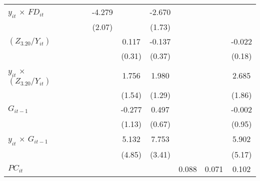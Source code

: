 \documentclass[12pt, a4paper]{article}
\begin{document}
\begin{table}
\begin{threeparttable}
{\begin{tabular}{l*{9}{c}}
				$y_{it}$ $\times$ $FD_{it}$ &                     &                     &                     &      -4.279\sym{*}  &                     &      -2.670         &                     &                     &                     \\
				&                     &                     &                     &      (2.07)         &                     &      (1.73)         &                     &                     &                     \\
				$(Z_{3.20}/Y_{it})$          &                     &                     &                     &                     &       0.117         &      -0.137         &                     &                     &      -0.022         \\
				&                     &                     &                     &                     &      (0.31)         &      (0.37)         &                     &                     &      (0.18)         \\
				$y_{it}$ $\times$ $(Z_{3.20}/Y_{it})$&                     &                     &                     &                     &       1.756         &       1.980         &                     &                     &       2.685         \\
				&                     &                     &                     &                     &      (1.54)         &      (1.29)         &                     &                     &      (1.86)         \\
				$G_{it-1}$             &                     &                     &                     &                     &      -0.277         &       0.497         &                     &                     &      -0.002         \\
				&                     &                     &                     &                     &      (1.13)         &      (0.67)         &                     &                     &      (0.95)         \\
				$y_{it}$ $\times$ $G_{it-1}$ &                     &                     &                     &                     &       5.132         &       7.753\sym{*}  &                     &                     &       5.902         \\
				&                     &                     &                     &                     &      (4.85)         &      (3.41)         &                     &                     &      (5.17)         \\
				$PC_{it}$                &                     &                     &                     &                     &                     &                     &       0.088         &       0.071         &       0.102         \\

\end{tabular}}
\end{threeparttable}
\end{table}
\end{document}
